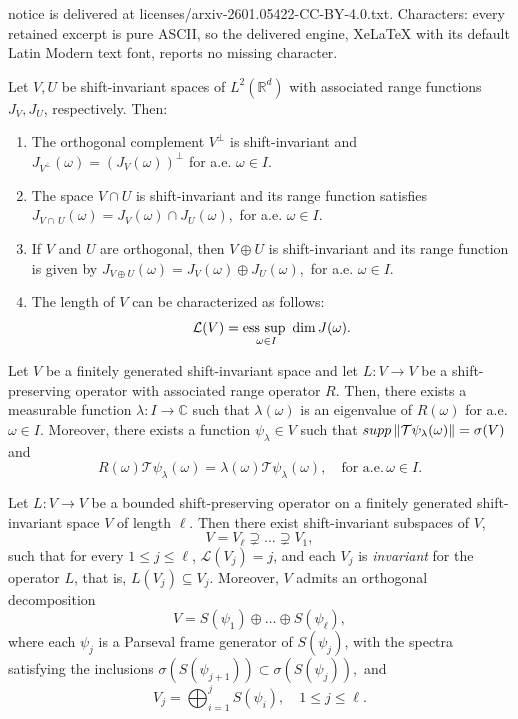 \documentclass[10pt,a4paper]{amsart}
\def\C{\mathbb{C}}
\def\R{\mathbb{R}}
\def\ele{\mathcal{L}}
\def\la{\lambda}
\def\w{\omega}
\newcommand{\supp}{{\rm supp\,}}
\begin{document}
notice is delivered at licenses/arxiv-2601.05422-CC-BY-4.0.txt. Characters: every retained excerpt is pure ASCII, so the delivered engine, XeLaTeX with its default Latin Modern text font, reports no missing character.
	\begin{lem}\label{range-properties}
		Let $V, U$ be shift-invariant spaces of $L^2(\R^d)$ with associated range functions $J_V, J_U$, respectively. Then:
		\begin{enumerate}
			\item[i)]\label{item 1 range-properties} The orthogonal complement  $V^{\perp}$ is shift-invariant and $J_{V^{\perp}}(\w)=\left(J_V(\w)\right)^{\perp}$ for a.e. $\w\in I $.
			\item[ii)]\label{item 2 range-properties} The space  $V\cap U$ is  shift-invariant and its range function satisfies $J_{V\cap\, U}(\omega) = J_V(\omega) \cap J_U(\omega),$
			for a.e. $\omega\in I$.
			\item[iii)]\label{item 3 range-properties} If $V$ and $U$ are orthogonal, then $V\oplus U$ is shift-invariant and its range function is given by $J_{V\oplus U}(\omega) = J_V(\omega) \oplus J_U(\omega),$ for a.e. $\omega\in I$.
			\item[iv)] The length of $V$ can be characterized as follows:
			$$\mathcal{L}(V) = \underset{\omega\in I}{\text{\rm ess sup }}  \dim J(\omega).$$
		\end{enumerate}
	\end{lem}

	\begin{pro}\label{An eigenvalue for R}
		Let $V$ be a finitely generated shift-invariant space and let $L:V\rightarrow V$ be a shift-preserving operator with associated range operator $R$. Then, there exists a measurable function $\la: I\to \C$ such that $\la(\w)$ is an eigenvalue of $R(\w)$ for a.e. $\w\in I$. Moreover, there exists a function $\psi_\la \in V$ such that $\supp \| \mathcal T \psi_\la(\w)\| = \sigma(V)$ and
		\begin{equation}\label{eq:eigenfunction}
			R(\w)\mathcal T \psi_\la(\w)=\la(\w) \mathcal T \psi_\la(\w), \quad \text{for a.e.} \, \w \in I.
		\end{equation}	
	\end{pro}

	\begin{teo}\label{triangular}
		Let $L :V\rightarrow V$ be a bounded shift-preserving operator on a finitely generated shift-invariant space $V$ of length $\ell$.
		Then there exist shift-invariant subspaces of $V$, 
		$$
		V=V_\ell\supsetneq \dots\supsetneq V_{1},
		$$ 
		such that for every $1\leq j\leq\ell$,  $\ele(V_j)=j$, and each $V_j$ is \textit{invariant} for the operator $L$, that is, 
		$ L(V_j)\subseteq V_j$. Moreover, $V$ admits an orthogonal decomposition
		$$
		V = S(\psi_1)\oplus \dots \oplus S(\psi_\ell),
		$$
		where each $\psi_j$ is a Parseval frame generator of $S(\psi_j)$,  with the spectra satisfying the inclusions 
		$
		\sigma(S(\psi_{j+1}))\subset \sigma(S(\psi_j)),
		$
		and
		$$
		V_j = \bigoplus_{i=1}^{j} S(\psi_i), \quad 1\leq j \leq \ell.
		$$
	\end{teo}
\end{document}

